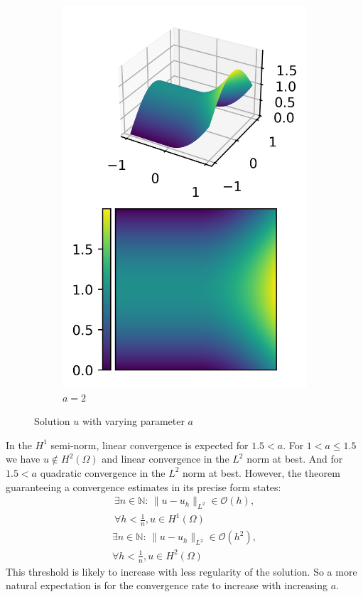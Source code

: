 \documentclass[11pt,a4paper]{article}
\begin{document}
\begin{multicols}{2}
\begin{figure}[H]
\begin{subfigure}{.5\linewidth}
    \includegraphics[width=.9\linewidth]{contour_nonsmooth_2}
    \caption{$a = 2$}
  \end{subfigure}
  \caption{Solution $u$ with varying parameter $a$}
  \label{fig:non_smooth_mixed_solution}
\end{figure}

In the $H^1$ semi-norm, linear convergence is expected for $1.5 < a$.
For $1 < a \le 1.5$ we have $u \notin H^2(\Omega)$ and linear convergence in the $L^2$ norm at best.
And for $1.5 < a$ quadratic convergence in the $L^2$ norm at best.
However, the theorem guaranteeing a convergence estimates in its precise form states:
\begin{multline}
    \exists n \in \mathbb{N}: \, \lVert u - u_h \rVert_{L^2} \in \mathcal{O}\left(h\right), \\ \forall h < \frac{1}{n}, u \in H^1(\Omega)
\end{multline}
\begin{multline}
    \exists n \in \mathbb{N}: \, \lVert u - u_h \rVert_{L^2} \in \mathcal{O}\left(h^2\right), \\ \forall h < \frac{1}{n}, u \in H^2(\Omega)
\end{multline}
This threshold is likely to increase with less regularity of the solution. So a more natural
expectation is for the convergence rate to increase with increasing $a$.



\end{multicols}
\end{document}
